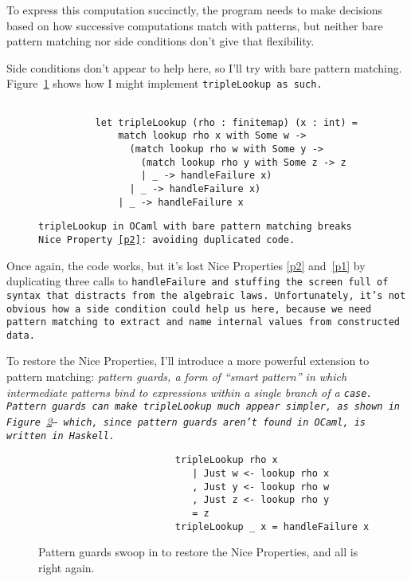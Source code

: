 \documentclass[manuscript,screen,review, 12pt, nonacm]{acmart}
\begin{document}
    To express this computation succinctly, the program needs to make decisions
    based on how successive computations match with patterns, but neither bare
    pattern matching nor side conditions don't give that flexibility. 
    
    Side conditions don't appear to help here, so I'll try with bare pattern
    matching. Figure~\ref{fig:pmtriplelookup} shows how I might implement
    \tt{tripleLookup} as such. 

    \begin{figure}[ht]
        \begin{verbatim}

          let tripleLookup (rho : finitemap) (x : int) =
              match lookup rho x with Some w -> 
                (match lookup rho w with Some y -> 
                  (match lookup rho y with Some z -> z
                  | _ -> handleFailure x)
                | _ -> handleFailure x)
              | _ -> handleFailure x
            \end{verbatim}
        \caption{\tt{tripleLookup} in OCaml with bare pattern matching breaks
                    Nice Property~\ref{p2}: avoiding duplicated code. } 
                    
        \label{fig:pmtriplelookup}
    \end{figure}

    Once again, the code works, but it's lost Nice Properties \ref{p2}
    and~\ref{p1} by duplicating three calls to \tt{handleFailure} and stuffing
    the screen full of syntax that distracts from the algebraic laws.
    Unfortunately, it's not obvious how a side condition could help us here,
    because we need pattern matching to extract and name internal values from
    constructed data.

    To restore the Nice Properties, I'll introduce a more powerful extension to
    pattern matching: \it{pattern guards}, a form of “smart pattern” in which
    intermediate patterns bind to expressions within a single branch of a
    \tt{case}. Pattern guards can make \tt{tripleLookup} \it{much} appear
    simpler, as shown in Figure~\ref{fig:guardtriplelookup}-- which, since
    pattern guards aren't found in OCaml, is written in Haskell.

    \begin{figure}[hbt!]  
        \begin{center}
        \begin{verbatim}
                        tripleLookup rho x
                           | Just w <- lookup rho x
                           , Just y <- lookup rho w
                           , Just z <- lookup rho y
                           = z
                        tripleLookup _ x = handleFailure x
        \end{verbatim}
        \end{center}    
    \caption{Pattern guards swoop in to restore the Nice Properties, and all is
    right again.} 
    \label{fig:guardtriplelookup}
    \end{figure}
\end{document}
